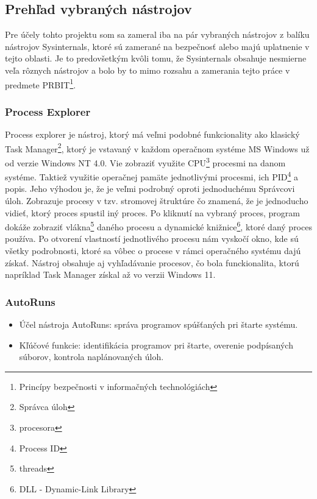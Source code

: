 \documentclass[conference]{IEEEtran}
\begin{document}
\subsection{Prehľad vybraných nástrojov}
Pre účely tohto projektu som sa zameral iba na pár vybraných nástrojov z balíku nástrojov Sysinternals, ktoré sú zamerané na bezpečnosť alebo majú uplatnenie v tejto oblasti. Je to predovšetkým kvôli tomu, že Sysinternals obsahuje nesmierne veľa rôznych nástrojov a bolo by to mimo rozsahu a zamerania tejto práce v predmete PRBIT\footnote{Princípy bezpečnosti v informačných technológiách}.
\subsubsection{Process Explorer}
Process explorer je nástroj, ktorý má veľmi podobné funkcionality ako klasický Task Manager\footnote{Správca úloh}, ktorý je vstavaný v každom operačnom systéme MS Windows už od verzie Windows NT 4.0. Vie zobraziť využite CPU\footnote{procesora} procesmi na danom systéme. Taktiež využitie operačnej pamäte jednotlivými procesmi, ich PID\footnote{Process ID} a popis. Jeho výhodou je, že je veľmi podrobný oproti jednoduchému Správcovi úloh. Zobrazuje procesy v tzv. stromovej štruktúre čo znamená, že je jednoducho vidieť, ktorý proces spustil iný proces. Po kliknutí na vybraný proces, program dokáže zobraziť vlákna\footnote{threads} daného procesu a dynamické knižnice\footnote{DLL - Dynamic-Link Library}, ktoré daný proces používa. Po otvorení vlastností jednotlivého procesu nám vyskočí okno, kde sú všetky podrobnosti, ktoré sa vôbec o procese v rámci operačného systému dajú získať. Nástroj obsahuje aj vyhľadávanie procesov, čo bola funckionalita, ktorú napríklad Task Manager získal až vo verzii Windows 11.

\subsubsection{AutoRuns}
\begin{itemize}
    \item Účel nástroja AutoRuns: správa programov spúšťaných pri štarte systému.
    \item Kľúčové funkcie: identifikácia programov pri štarte, overenie podpísaných súborov, kontrola naplánovaných úloh.
\end{itemize}
\end{document}
